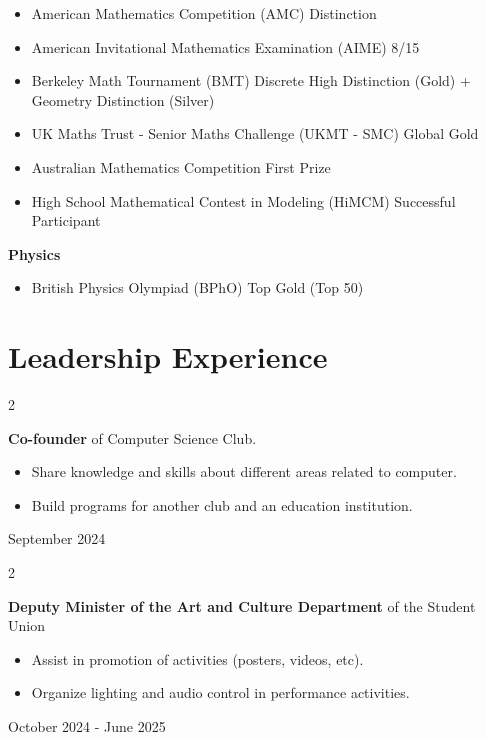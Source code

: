 \documentclass[10pt, letterpaper]{article}
\newenvironment{highlights}{
    \begin{itemize}[
        topsep=0.10 cm,
        parsep=0.10 cm,
        partopsep=0pt,
        itemsep=0pt,
        leftmargin=0.4 cm + 10pt
    ]
}{
    \end{itemize}
} %
\newenvironment{twocolentry}[2][]{
    \onecolentry
    \def\secondColumn{#2}
    \setcolumnwidth{\fill, 4.5 cm}
    \begin{paracol}{2}
}{
    \switchcolumn \raggedleft \secondColumn
    \end{paracol}
    \endonecolentry
} %
\begin{document}
    \begin{highlights}
        \item American Mathematics Competition (AMC) \hfill Distinction

        \item American Invitational Mathematics Examination (AIME) \hfill 8/15

        \item Berkeley Math Tournament (BMT) \hfill Discrete High Distinction (Gold) + Geometry Distinction (Silver)

        \item UK Maths Trust - Senior Maths Challenge (UKMT - SMC) \hfill Global Gold

        \item Australian Mathematics Competition \hfill First Prize

        \item High School Mathematical Contest in Modeling (HiMCM) \hfill Successful Participant
    \end{highlights}
    
    \textbf{Physics}

    \begin{highlights}
        \item British Physics Olympiad (BPhO) \hfill Top Gold (Top 50)
    \end{highlights}


    \section{Leadership Experience}
    
    \begin{twocolentry}{ September 2024 }
        \textbf{Co-founder} of Computer Science Club.

        \begin{highlights}
            \item Share knowledge and skills about different areas related to computer.
            \item Build programs for another club and an education institution.
        \end{highlights}
    \end{twocolentry}

    \begin{twocolentry}{ October 2024 - June 2025 }
        \textbf{Deputy Minister of the Art and Culture Department} of the Student Union

        \begin{highlights}
            \item Assist in promotion of activities (posters, videos, etc).
            \item Organize lighting and audio control in performance activities.
        \end{highlights}
    \end{twocolentry}
\end{document}

